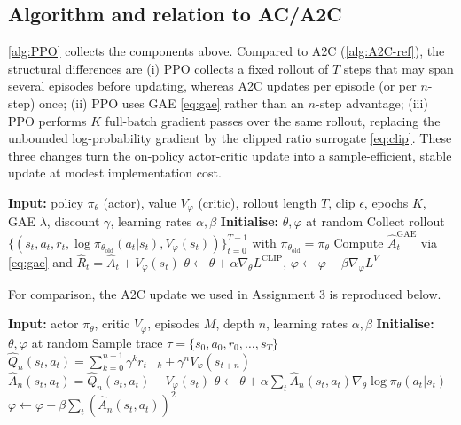 \documentclass{article}
\theoremstyle{plain}
\theoremstyle{definition}
\theoremstyle{remark}
\begin{document}
\subsection{Algorithm and relation to AC/A2C}\label{sec:theory:alg}

\autoref{alg:PPO} collects the components above. Compared to A2C (\autoref{alg:A2C-ref}), the structural differences are (i) PPO collects a fixed rollout of $T$ steps that may span several episodes before updating, whereas A2C updates per episode (or per $n$-step) once; (ii) PPO uses GAE \cref{eq:gae} rather than an $n$-step advantage; (iii) PPO performs $K$ full-batch gradient passes over the same rollout, replacing the unbounded log-probability gradient by the clipped ratio surrogate \cref{eq:clip}. These three changes turn the on-policy actor-critic update into a sample-efficient, stable update at modest implementation cost.

\begin{algorithm}[H]
    \caption{PPO-clipped with GAE}
    \begin{algorithmic}
        \STATE \textbf{Input:} policy $\pi_\theta$ (actor), value $V_\varphi$ (critic), rollout length $T$, clip $\epsilon$, epochs $K$, GAE $\lambda$, discount $\gamma$, learning rates $\alpha,\beta$
        \STATE \textbf{Initialise:} $\theta,\varphi$ at random
            \STATE Collect rollout $\{(s_t,a_t,r_t,\log\pi_{\theta_{\mathrm{old}}}(a_t|s_t),V_\varphi(s_t))\}_{t=0}^{T-1}$ with $\pi_{\theta_{\mathrm{old}}}=\pi_\theta$
            \STATE Compute $\hat A_t^{\mathrm{GAE}}$ via \cref{eq:gae} and $\hat R_t=\hat A_t+V_\varphi(s_t)$
                \STATE $\theta\!\leftarrow\!\theta\!+\!\alpha\nabla_\theta L^{\mathrm{CLIP}}$, $\varphi\!\leftarrow\!\varphi\!-\!\beta\nabla_\varphi L^{V}$
            \ENDFOR
        \ENDWHILE
    \end{algorithmic}
    \label{alg:PPO}
\end{algorithm}

For comparison, the A2C update we used in Assignment 3 is reproduced below.

\begin{algorithm}[H]
    \caption{Advantage Actor Critic (A2C); reproduced from Assignment 3}
    \begin{algorithmic}
        \STATE \textbf{Input:} actor $\pi_\theta$, critic $V_\varphi$, episodes $M$, depth $n$, learning rates $\alpha,\beta$
        \STATE \textbf{Initialise:} $\theta,\varphi$ at random
            \STATE Sample trace $\tau=\{s_0,a_0,r_0,\ldots,s_T\}$
                \STATE $\hat Q_n(s_t,a_t)=\sum_{k=0}^{n-1}\gamma^k r_{t+k}+\gamma^{n}V_\varphi(s_{t+n})$
                \STATE $\hat A_n(s_t,a_t)=\hat Q_n(s_t,a_t)-V_\varphi(s_t)$
            \ENDFOR
            \STATE $\theta\!\leftarrow\!\theta+\alpha\sum_t \hat A_n(s_t,a_t)\nabla_\theta\log\pi_\theta(a_t|s_t)$
            \STATE $\varphi\!\leftarrow\!\varphi-\beta\sum_t (\hat A_n(s_t,a_t))^{2}$
        \ENDFOR
    \end{algorithmic}
    \label{alg:A2C-ref}
\end{algorithm}
\end{document}
